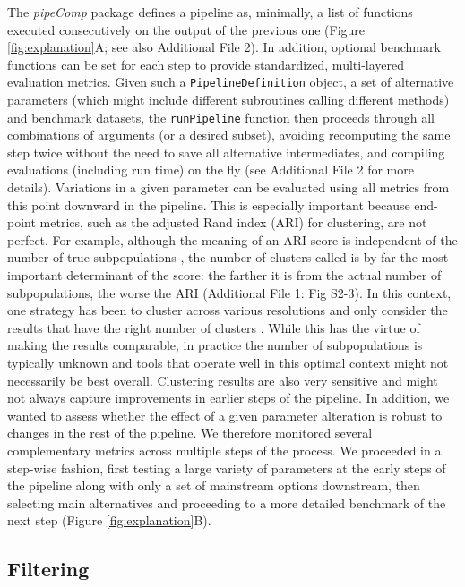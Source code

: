 \documentclass{bmcart}
\begin{document}
The \textit{pipeComp} package defines a pipeline as, minimally, a list of functions executed consecutively on the output of the previous one (Figure \ref{fig:explanation}A; {\color{red}see also Additional File 2}). In addition, optional benchmark functions can be set for each step to provide standardized, multi-layered evaluation metrics. Given such a \texttt{PipelineDefinition} object, a set of alternative parameters (which might include different subroutines calling different methods) and benchmark datasets, the \texttt{runPipeline} function then proceeds through all combinations of arguments (or a desired subset), avoiding recomputing the same step twice without the need to save all alternative intermediates, and compiling evaluations (including run time) on the fly ({\color{red}see Additional File 2 for more details}). Variations in a given parameter can be evaluated using all metrics from this point downward in the pipeline. This is especially important because end-point metrics, such as the adjusted Rand index (ARI) \cite{HubertARI1985} for clustering, are not perfect. For example, although the meaning of an ARI score is independent of the number of true subpopulations \cite{steinleyProperties2004}, the number of clusters called is by far the most important determinant of the score: the farther it is from the actual number of subpopulations, the worse the ARI (Additional File 1: Fig S2-3). In this context, one strategy has been to cluster across various resolutions and only consider the results that have the right number of clusters \cite{duoClustering2018}. While this has the virtue of making the results comparable, in practice the number of subpopulations is typically unknown and tools that operate well in this optimal context might not necessarily be best overall. Clustering results are also very sensitive and might not always capture improvements in earlier steps of the pipeline. In addition, we wanted to assess whether the effect of a given parameter alteration is robust to changes in the rest of the pipeline. We therefore monitored several complementary metrics across multiple steps of the process. We proceeded in a step-wise fashion, first testing a large variety of parameters at the early steps of the pipeline along with only a set of mainstream options downstream, then selecting main alternatives and proceeding to a more detailed benchmark of the next step (Figure \ref{fig:explanation}B).

\subsection*{Filtering}
\end{document}
